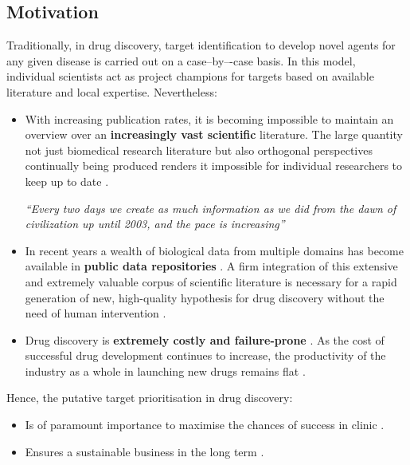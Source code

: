 \subsection{Motivation}

Traditionally, in drug discovery, target identification to develop novel agents for any given disease is carried out on a case--by–-case basis. In this model, individual scientists act as project champions for targets based on available literature and local expertise. Nevertheless:

\begin{itemize}
    
    \item With increasing publication rates, it is becoming impossible to maintain an overview over an \textbf{increasingly vast scientific} literature. The large quantity not just biomedical research literature but also orthogonal perspectives continually being produced renders it impossible for individual researchers to keep up to date \cite{brown2018}.
    
    \begin{center}
    \emph{``Every two days we create as much information as we did from the dawn of civilization up until 2003, and the pace is increasing''}
    \end{center}
    
    \item In recent years a wealth of biological data from multiple domains has become available in \textbf{public data repositories} \cite{brown2018}. A firm integration of this extensive and extremely valuable corpus of scientific literature is necessary for a rapid generation of new, high-quality hypothesis for drug discovery without the need of human intervention \cite{ferrero2017, brown2018}.
    
    \item Drug discovery is \textbf{extremely costly and failure-prone} \cite{ferrero2017}. As the cost of successful drug development continues to increase, the productivity of the industry as a whole in launching new drugs remains flat \cite{brown2018}.
    
\end{itemize}

Hence, the putative target prioritisation in drug discovery:
\begin{itemize}
    \item Is of paramount importance to maximise the chances of success in clinic \cite{ferrero2017}.
    
    \item Ensures a sustainable business in the long term \cite{ferrero2017}.
\end{itemize}


